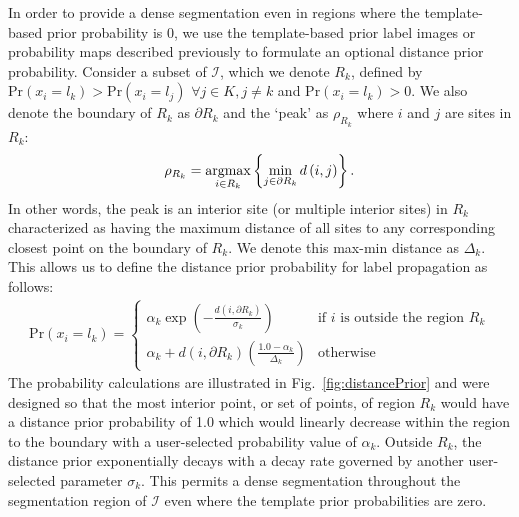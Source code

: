 \documentclass[11pt,english]{article}
\newcommand{\argmax}{\operatornamewithlimits{argmax}}
\begin{document}
In order to provide a dense segmentation even in regions where the template-based prior probability is 0, we use the template-based prior label images or probability maps described previously to formulate an optional distance prior probability.
Consider a subset of $\mathcal{I}$, which we denote $R_k$, defined by $\mathrm{Pr}(x_i = l_k) > \mathrm{Pr}(x_i = l_j) \,\,\forall j \in K, j \neq k$ and $\mathrm{Pr}(x_i = l_k) > 0$. 
We also denote the boundary of $R_k$ as $\partial R_k$ and the `peak' as $\rho_{R_k}$ where $i$ and $j$ are sites in $R_k$:
\begin{align}
  \rho_{R_k} = \argmax_{i \in R_k} \left\{ \min_{j \in \partial {R_k}} d\left(i,j\right)\right\}.
\end{align}
In other words, the peak is an interior site (or multiple interior sites) in $R_k$ characterized as having the maximum distance of all sites to any corresponding closest point on the boundary of $R_k$.  We denote this max-min distance as $\Delta_k$.  This allows us to define the distance prior probability for label propagation as follows:
\begin{align}\label{eq:prop}
  \mathrm{Pr}(x_i = l_k) = \left\{
                                               \begin{array}{ll}
                                                \alpha_k \exp \left( -\frac{d(i, \partial R_k)}{\sigma_k} \right) & \text{if } i \text{ is outside the region } R_k \\
                                                \alpha_k + d\left(i, \partial R_k\right)\left(\frac{1.0 - \alpha_k}{\Delta_k}\right) & \text{otherwise}
                                                \end{array}
                                                \right.
\end{align}
The probability calculations are illustrated in Fig.~\ref{fig:distancePrior} and were designed so that the most interior point, or set of points, of region $R_k$ would have a distance prior probability of 1.0 which would linearly decrease within the region to the boundary with a user-selected probability value of $\alpha_k$.  Outside $R_k$, the distance prior exponentially decays with a decay rate governed by another user-selected parameter $\sigma_k$.  This permits a dense segmentation throughout the segmentation region of $\mathcal{I}$ even where the template prior probabilities are zero. 
\end{document}
